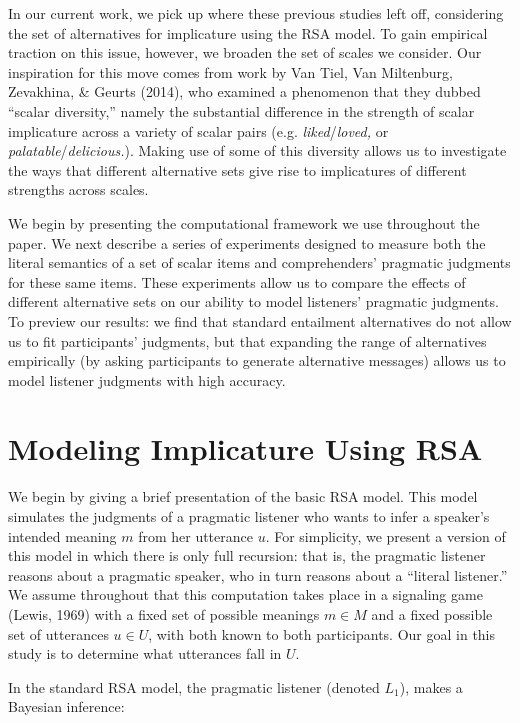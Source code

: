 \documentclass[10pt, letterpaper]{article}
\begin{document}
In our current work, we pick up where these previous studies left off,
considering the set of alternatives for implicature using the RSA model.
To gain empirical traction on this issue, however, we broaden the set of
scales we consider. Our inspiration for this move comes from work by Van
Tiel, Van Miltenburg, Zevakhina, \& Geurts (2014), who examined a
phenomenon that they dubbed ``scalar diversity,'' namely the substantial
difference in the strength of scalar implicature across a variety of
scalar pairs (e.g. \emph{liked}/\emph{loved,} or
\emph{palatable}/\emph{delicious.}). Making use of some of this
diversity allows us to investigate the ways that different alternative
sets give rise to implicatures of different strengths across scales.

We begin by presenting the computational framework we use throughout the
paper. We next describe a series of experiments designed to measure both
the literal semantics of a set of scalar items and comprehenders'
pragmatic judgments for these same items. These experiments allow us to
compare the effects of different alternative sets on our ability to
model listeners' pragmatic judgments. To preview our results: we find
that standard entailment alternatives do not allow us to fit
participants' judgments, but that expanding the range of alternatives
empirically (by asking participants to generate alternative messages)
allows us to model listener judgments with high accuracy.

\section{Modeling Implicature Using
RSA}\label{modeling-implicature-using-rsa}

We begin by giving a brief presentation of the basic RSA model. This
model simulates the judgments of a pragmatic listener who wants to infer
a speaker's intended meaning \(m\) from her utterance \(u\). For
simplicity, we present a version of this model in which there is only
full recursion: that is, the pragmatic listener reasons about a
pragmatic speaker, who in turn reasons about a ``literal listener.'' We
assume throughout that this computation takes place in a signaling game
(Lewis, 1969) with a fixed set of possible meanings \(m \in M\) and a
fixed possible set of utterances \(u \in U\), with both known to both
participants. Our goal in this study is to determine what utterances
fall in \(U\).

In the standard RSA model, the pragmatic listener (denoted \(L_1\)),
makes a Bayesian inference:
\end{document}
